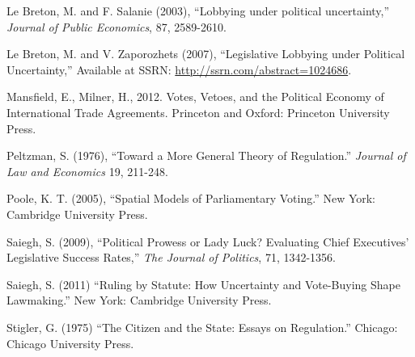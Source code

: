 \documentclass[12pt]{article}
\begin{document}
\begin{list}{}{\setlength{\leftmargin}{0.3in}\setlength{\rightmargin}{0.0in}\setlength{\itemindent}{-0.3in}\setlength{\itemsep}{0.0in}}
\item Le Breton, M. and F. Salanie (2003), ``Lobbying under political uncertainty,'' {\em Journal of Public Economics}, 87, 2589-2610.

\item Le Breton, M. and V. Zaporozhets (2007), ``Legislative Lobbying under Political Uncertainty,'' Available at SSRN: \url{http://ssrn.com/abstract=1024686}.

\item Mansfield, E., Milner, H., 2012. Votes, Vetoes, and the Political Economy of International Trade Agreements. Princeton and Oxford: Princeton  University Press.

\item Peltzman, S. (1976), ``Toward a More General Theory of Regulation.'' {\em Journal of Law and Economics} 19, 211-248.

\item Poole, K. T. (2005), ``Spatial Models of Parliamentary Voting.'' New York: Cambridge University Press.

\item Saiegh, S. (2009), ``Political  Prowess or Lady Luck? Evaluating Chief Executives' Legislative Success Rates,'' {\em The Journal of Politics}, 71, 1342-1356.

\item Saiegh, S. (2011) ``Ruling by Statute: How Uncertainty and Vote-Buying Shape Lawmaking.'' New York: Cambridge University Press.

\item Stigler, G. (1975) ``The Citizen and the State: Essays on Regulation.'' Chicago: Chicago University Press.

\end{list}
\end{document}

